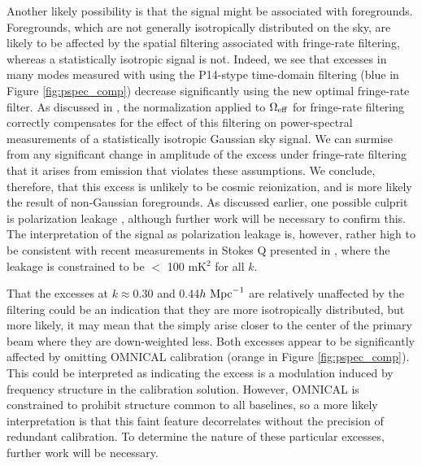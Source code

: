 \documentclass[twocolumn,numberedappendix]{emulateapj} \shorttitle{New Limits on the 21 cm Power Spectrum at $z=8.4$}
\newcommand{\hMpci}{h\ {\rm Mpc}^{-1}}
\begin{document}
Another likely possibility is that the signal might be associated with foregrounds.
Foregrounds, which are not generally isotropically distributed on the sky, are likely
to be affected by the spatial filtering associated with fringe-rate filtering, whereas
a statistically isotropic signal is not.  
Indeed, we see that excesses in many modes
measured with using the P14-stype time-domain filtering (blue in Figure \ref{fig:pspec_comp})
decrease significantly using the new optimal fringe-rate filter.  
As discussed in \citet{parsons_et_al2015},
the normalization applied to $\Omega_{\rm eff}$ for fringe-rate filtering correctly
compensates for the effect of this filtering on power-spectral measurements
of a statistically isotropic Gaussian sky signal.  We can surmise from any significant change in amplitude of the excess
under fringe-rate filtering that it arises from emission that violates these assumptions.
We conclude, therefore, that this excess is unlikely to be cosmic reionization, and is more
likely the result of non-Gaussian foregrounds.
As discussed earlier, one possible
culprit is polarization leakage \citep{moore_et_al2013,jelic_et_al2010,jelic_et_al2014}, although further
work will be necessary to confirm this.  The interpretation of
the signal as polarization leakage is, however, rather high to be consistent
with recent measurements in Stokes Q presented in \citet{moore_et_al2015},
where the leakage is constrained to be $<$ 100 mK$^{2}$ for all $k$.

That the
excesses at $k\approx0.30$ and 0.44$\hMpci$ are relatively unaffected by the filtering
could be an indication that they are more isotropically distributed, but more likely, it
may mean that the simply arise closer to the center of the primary beam where they are
down-weighted less.
Both excesses appear to be significantly affected by omitting OMNICAL calibration
(orange in Figure \ref{fig:pspec_comp}).  This could be interpreted as indicating the 
excess is a modulation induced by frequency structure
in the calibration solution.  However, OMNICAL is constrained
to prohibit structure common to all baselines, so a more likely interpretation is that 
this faint feature decorrelates without the precision of redundant calibration.  To
determine the nature of these particular excesses, further work will be necessary.
\end{document}
